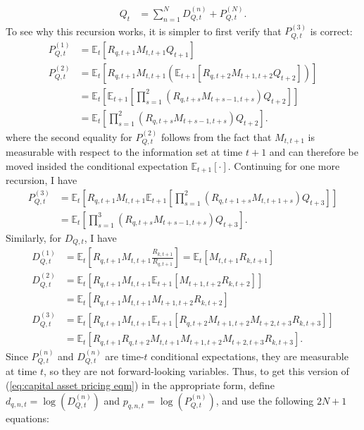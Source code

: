 \documentclass[12 pt, oneside]{article}
\theoremstyle{definition}
\theoremstyle{definition}
\theoremstyle{definition}
\newcommand{\E}{\mathbb{E}}
\begin{document}
\begin{align*}
  Q_t & = \sum_{n = 1}^ND_{Q, t}^{(n)} + P_{Q, t}^{(N)}.
\end{align*}
To see why this recursion works, it is simpler to first verify that $P_{Q, t}^{(3)}$ is correct:
\begin{align*}
  P_{Q, t}^{(1)} & = \E_t\left[R_{q, t + 1}M_{t, t + 1} Q_{t + 1}\right]\\
  P_{Q, t}^{(2)} & = \E_t\left[R_{q, t + 1}M_{t, t + 1} (\E_{t + 1}[R_{q, t + 2}M_{t + 1, t + 2} Q_{t + 2}])\right]\\
                 & = \E_t\left[\E_{t + 1}\left[\prod_{s = 1}^2(R_{q, t + s}M_{t + s - 1, t + s}) Q_{t + 2}\right]\right]\\
                 & = \E_t\left[\prod_{s = 1}^2(R_{q, t + s}M_{t + s - 1, t + s}) Q_{t + 2}\right].
\end{align*}
where the second equality for $P_{Q, t}^{(2)}$ follows from the fact that $M_{t, t + 1}$ is measurable with respect to the information set at time $t + 1$ and can
therefore be moved insided the conditional expectation $\E_{t + 1}[\cdot]$. Continuing for one more recursion, I have
\begin{align*}
  P_{Q, t}^{(3)} & = \E_t\left[R_{q, t + 1}M_{t, t + 1}\E_{t + 1}\left[\prod_{s = 1}^2(R_{q, t + 1 + s}M_{t, t + 1 + s}) Q_{t + 3}\right]\right]\\
                 & = \E_t\left[\prod_{s = 1}^3(R_{q, t + s}M_{t + s - 1, t + s}) Q_{t + 3}\right].
\end{align*}
Similarly, for $D_{Q, t}$, I have
\begin{align*}
  D_{Q, t}^{(1)} & = \E_t\left[R_{q, t + 1}M_{t, t + 1}\frac{R_{k, t + 1}}{R_{q, t + 1}}\right] = \E_t[M_{t, t + 1} R_{k, t + 1}]\\
  D_{Q, t}^{(2)} & = \E_t[R_{q, t + 1}M_{t, t + 1}\E_{t + 1}[M_{t + 1, t + 2}R_{k, t + 2}]]\\
                 & = \E_t[R_{q, t + 1}M_{t, t + 1}M_{t + 1, t + 2}R_{k, t + 2}]\\
  D_{Q, t}^{(3)} & = \E_t[R_{q, t + 1}M_{t, t + 1}\E_{t + 1}[R_{q, t + 2}M_{t + 1, t + 2}M_{t + 2, t + 3}R_{k, t + 3}]]\\
                 & = \E_t[R_{q, t + 1}R_{q, t + 2}M_{t, t + 1}M_{t + 1, t + 2}M_{t + 2, t + 3}R_{k, t + 3}].
\end{align*}
Since $P_{Q, t}^{(n)}$ and $D_{Q, t}^{(n)}$ are time-$t$ conditional expectations, they are measurable at time $t$, so they are not forward-looking variables. Thus, to get this version of (\ref{eq:capital asset pricing eqm}) in the appropriate form, define $d_{q, n, t} = \log(D_{Q, t}^{(n)})$ and $p_{q, n, t} = \log(P_{Q, t}^{(n)})$, and use the following $2N + 1$ equations:
\end{document}
